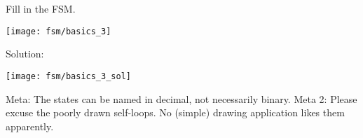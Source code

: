 \begin{blocksection}
\question
Fill in the FSM.

\texttt{[image: fsm/basics\_3]}

\begin{solution}
Solution:

\texttt{[image: fsm/basics\_3\_sol]}

Meta: The states can be named in decimal, not necessarily binary.
Meta 2: Please excuse the poorly drawn self-loops. No (simple) drawing application likes them apparently.
\end{solution}
\end{blocksection}